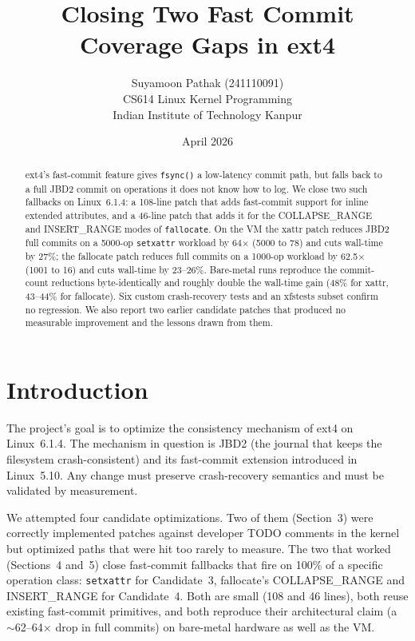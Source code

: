 \documentclass[11pt,a4paper]{article}
\title{Closing Two Fast Commit Coverage Gaps in ext4}
\author{
    Suyamoon Pathak (241110091) \\
    CS614 Linux Kernel Programming \\
    Indian Institute of Technology Kanpur
}
\date{April 2026}
\begin{document}
\maketitle

\begin{abstract}
ext4's fast-commit feature gives \texttt{fsync()} a low-latency
commit path, but falls back to a full JBD2 commit on operations it
does not know how to log. We close two such fallbacks on
Linux~6.1.4: a 108-line patch that adds fast-commit support for
inline extended attributes, and a 46-line patch that adds it for
the COLLAPSE\_RANGE and INSERT\_RANGE modes of \texttt{fallocate}.
On the VM the xattr patch reduces JBD2 full commits on a 5000-op
\texttt{setxattr} workload by 64$\times$ (5000 to 78) and cuts
wall-time by 27\%; the fallocate patch reduces full commits on a
1000-op workload by 62.5$\times$ (1001 to 16) and cuts wall-time
by 23--26\%. Bare-metal runs reproduce the commit-count reductions
byte-identically and roughly double the wall-time gain (48\% for
xattr, 43--44\% for fallocate). Six custom crash-recovery tests
and an xfstests subset confirm no regression. We also report two
earlier candidate patches that produced no measurable improvement
and the lessons drawn from them.
\end{abstract}

\section{Introduction}

The project's goal is to optimize the consistency mechanism of
ext4 on Linux~6.1.4. The mechanism in question is JBD2 (the
journal that keeps the filesystem crash-consistent) and its
fast-commit extension introduced in Linux~5.10. Any change must
preserve crash-recovery semantics and must be validated by
measurement.

We attempted four candidate optimizations. Two of them (Section~3)
were correctly implemented patches against developer TODO comments
in the kernel but optimized paths that were hit too rarely to
measure. The two that worked (Sections~4 and~5) close fast-commit
fallbacks that fire on 100\% of a specific operation class:
\texttt{setxattr} for Candidate~3, fallocate's COLLAPSE\_RANGE and
INSERT\_RANGE for Candidate~4. Both are small (108 and 46 lines),
both reuse existing fast-commit primitives, and both reproduce
their architectural claim (a $\sim$62--64$\times$ drop in full
commits) on bare-metal hardware as well as the VM.
\end{document}
